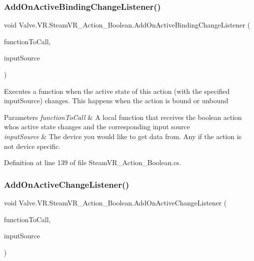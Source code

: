 \subsubsection{\texorpdfstring{AddOnActiveBindingChangeListener()}{AddOnActiveBindingChangeListener()}}
{\footnotesize\ttfamily void Valve.\+V\+R.\+Steam\+V\+R\+\_\+\+Action\+\_\+\+Boolean.\+Add\+On\+Active\+Binding\+Change\+Listener (\begin{DoxyParamCaption}\item[{\mbox{\hyperlink{class_valve_1_1_v_r_1_1_steam_v_r___action___boolean_af9f3044d5e4868485945b70d907c6bbb}{Active\+Change\+Handler}}}]{function\+To\+Call,  }\item[{\mbox{\hyperlink{namespace_valve_1_1_v_r_a82e5bf501cc3aa155444ee3f0662853f}{Steam\+V\+R\+\_\+\+Input\+\_\+\+Sources}}}]{input\+Source }\end{DoxyParamCaption})}



Executes a function when the active state of this action (with the specified input\+Source) changes. This happens when the action is bound or unbound 


\begin{DoxyParams}{Parameters}
{\em function\+To\+Call} & A local function that receives the boolean action who\textquotesingle{}s active state changes and the corresponding input source\\
\hline
{\em input\+Source} & The device you would like to get data from. Any if the action is not device specific.\\
\hline
\end{DoxyParams}


Definition at line 139 of file Steam\+V\+R\+\_\+\+Action\+\_\+\+Boolean.\+cs.

\mbox{\label{class_valve_1_1_v_r_1_1_steam_v_r___action___boolean_aafd99e0f3abcda6a07f8f9b900afe15e}} 
\subsubsection{\texorpdfstring{AddOnActiveChangeListener()}{AddOnActiveChangeListener()}}
{\footnotesize\ttfamily void Valve.\+V\+R.\+Steam\+V\+R\+\_\+\+Action\+\_\+\+Boolean.\+Add\+On\+Active\+Change\+Listener (\begin{DoxyParamCaption}\item[{\mbox{\hyperlink{class_valve_1_1_v_r_1_1_steam_v_r___action___boolean_af9f3044d5e4868485945b70d907c6bbb}{Active\+Change\+Handler}}}]{function\+To\+Call,  }\item[{\mbox{\hyperlink{namespace_valve_1_1_v_r_a82e5bf501cc3aa155444ee3f0662853f}{Steam\+V\+R\+\_\+\+Input\+\_\+\+Sources}}}]{input\+Source }\end{DoxyParamCaption})}



